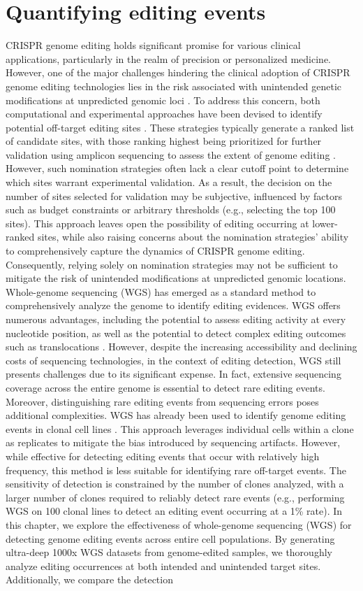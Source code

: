 \documentclass[a4paper, titlepage, openright]{book}
\newcommand{\mychapter}[2]{
    \setcounter{chapter}{#1}
    \setcounter{section}{0}
    \chapter*{#2}
    \addcontentsline{toc}{chapter}{#2}
}
\begin{document}
\mychapter{8}{Quantifying editing events}
CRISPR genome editing \citep{cong2013multiplex} holds significant promise for various clinical applications, particularly in the realm of precision or personalized medicine. However, one of the major challenges hindering the clinical adoption of CRISPR genome editing technologies lies in the risk associated with unintended genetic modifications at unpredicted genomic loci \citep{fu2013high}. To address this concern, both computational and experimental approaches have been devised to identify potential off-target editing sites \citep{clement2020technologies}. These strategies typically generate a ranked list of candidate sites, with those ranking highest being prioritized for further validation using amplicon sequencing to assess the extent of genome editing \citep{akcakaya2018vivo}. However, such nomination strategies often lack a clear cutoff point to determine which sites warrant experimental validation. As a result, the decision on the number of sites selected for validation may be subjective, influenced by factors such as budget constraints or arbitrary thresholds (e.g., selecting the top 100 sites). This approach leaves open the possibility of editing occurring at lower-ranked sites, while also raising concerns about the nomination strategies' ability to comprehensively capture the dynamics of CRISPR genome editing. Consequently, relying solely on nomination strategies may not be sufficient to mitigate the risk of unintended modifications at unpredicted genomic locations. Whole-genome sequencing (WGS) has emerged as a standard method to comprehensively analyze the genome to identify editing evidences. WGS offers numerous advantages, including the potential to assess editing activity at every nucleotide position, as well as the potential to detect complex editing outcomes such as translocations \citep{yin2022cas9}. However, despite the increasing accessibility and declining costs of sequencing technologies, in the context of editing detection, WGS still presents challenges due to its significant expense. In fact, extensive sequencing coverage across the entire genome is essential to detect rare editing events. Moreover, distinguishing rare editing events from sequencing errors poses additional complexities. WGS has already been used to identify genome editing events in clonal cell lines \citep{smith2014whole,veres2014low}. This approach leverages individual cells within a clone as replicates to mitigate the bias introduced by sequencing artifacts. However, while effective for detecting editing events that occur with relatively high frequency, this method is less suitable for identifying rare off-target events. The sensitivity of detection is constrained by the number of clones analyzed, with a larger number of clones required to reliably detect rare events (e.g., performing WGS on 100 clonal lines to detect an editing event occurring at a 1\% rate). In this chapter, we explore the effectiveness of whole-genome sequencing (WGS) for detecting genome editing events across entire cell populations. By generating ultra-deep 1000x WGS datasets from genome-edited samples, we thoroughly analyze editing occurrences at both intended and unintended target sites. Additionally, we compare the detection 
\end{document}
